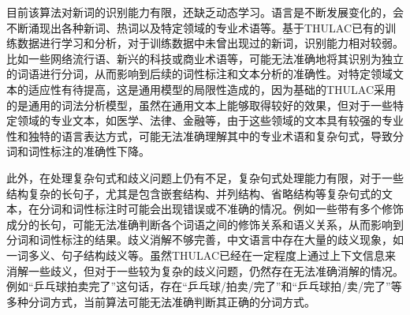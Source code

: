 目前该算法对新词的识别能力有限，还缺乏动态学习。语言是不断发展变化的，会不断涌现出各种新词、热词以及特定领域的专业术语等。基于\textrm{THULAC}已有的训练数据进行学习和分析，对于训练数据中未曾出现过的新词，识别能力相对较弱。比如一些网络流行语、新兴的科技或商业术语等，可能无法准确地将其识别为独立的词语进行分词，从而影响到后续的词性标注和文本分析的准确性。对特定领域文本的适应性有待提高，这是通用模型的局限性造成的，因为基础的\textrm{THULAC}采用的是通用的词法分析模型，虽然在通用文本上能够取得较好的效果，但对于一些特定领域的专业文本，如医学、法律、金融等，由于这些领域的文本具有较强的专业性和独特的语言表达方式，可能无法准确理解其中的专业术语和复杂句式，导致分词和词性标注的准确性下降。

此外，在处理复杂句式和歧义问题上仍有不足，复杂句式处理能力有限，对于一些结构复杂的长句子，尤其是包含嵌套结构、并列结构、省略结构等复杂句式的文本，在分词和词性标注时可能会出现错误或不准确的情况。例如一些带有多个修饰成分的长句，可能无法准确判断各个词语之间的修饰关系和语义关系，从而影响到分词和词性标注的结果。歧义消解不够完善，中文语言中存在大量的歧义现象，如一词多义、句子结构歧义等。虽然\textrm{THULAC}已经在一定程度上通过上下文信息来消解一些歧义，但对于一些较为复杂的歧义问题，仍然存在无法准确消解的情况。例如``乒乓球拍卖完了''这句话，存在``乒乓球/拍卖/完了''和``乒乓球拍/卖/完了''等多种分词方式，当前算法可能无法准确判断其正确的分词方式。


